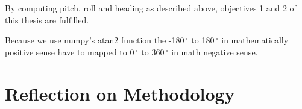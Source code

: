 By computing pitch, roll and heading as described above, objectives 1 and 2 of this thesis are fulfilled.

Because we use numpy's atan2 function the -180\,$^\circ$ to 180\,$^\circ$ in mathematically positive sense have to mapped to 0\,$^\circ$ to 360\,$^\circ$ in math negative sense. 

\section{Reflection on Methodology \label{sec:meth:reflection_methodology}}